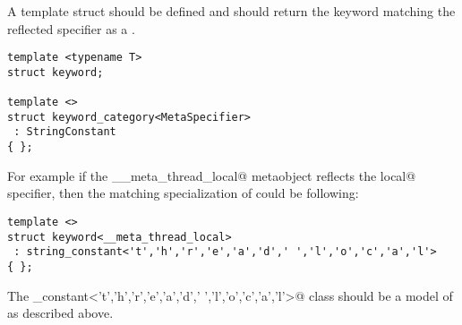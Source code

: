 A template struct \verb@keyword@ should be defined and should return
the keyword matching the reflected specifier as a
.

\begin{lstlisting}
template <typename T>
struct keyword;

template <>
struct keyword_category<MetaSpecifier>
 : StringConstant
{ };
\end{lstlisting}

For example if the \verb@__meta_thread_local@ metaobject reflects the \verb@thread local@
specifier, then the matching specialization of \verb@keyword@ could be following:

\begin{lstlisting}
template <>
struct keyword<__meta_thread_local>
 : string_constant<'t','h','r','e','a','d',' ','l','o','c','a','l'>
{ };
\end{lstlisting}

The \verb@string_constant<'t','h','r','e','a','d',' ','l','o','c','a','l'>@
class should be a model of  as described above.

